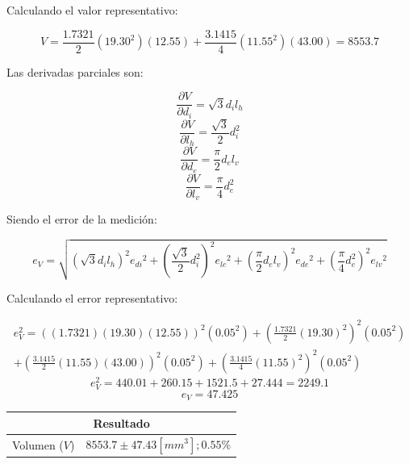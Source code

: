 \documentclass[letter,11pt]{article}
\begin{document}
Calculando el valor representativo:

\begin{equation*}
    V = \frac{1.7321}{2}(19.30^2)(12.55)+\frac{3.1415}{4}(11.55^2)(43.00)=8553.7
\end{equation*}

Las derivadas parciales son:

\begin{equation}
    \frac{\partial{V}}{\partial{d_i}} = \sqrt{3} d_i l_h
\end{equation}
\begin{equation}
    \frac{\partial{V}}{\partial{l_h}} = \frac{\sqrt{3}}{2} d_i^2
\end{equation}
\begin{equation}
    \frac{\partial{V}}{\partial{d_e}} = \frac{\pi}{2} d_e l_v
\end{equation}
\begin{equation}
    \frac{\partial{V}}{\partial{l_v}} = \frac{\pi}{4} d_e^2
\end{equation}

Siendo el error de la medición:

\begin{equation}
    e_V = \sqrt{
        \left(\sqrt{3}d_il_h\right)^2{e_{di}}^2+
        \left(\frac{\sqrt{3}}{2}d_i^2\right)^2{e_{lc}}^2+
        \left(\frac{\pi}{2}d_el_v\right)^2{e_{de}}^2+
        \left(\frac{\pi}{4}d_e^2\right)^2{e_{lv}}^2
    }
\end{equation}

Calculando el error representativo:

\begin{equation*}
\begin{split}
    e_V^2 = 
        \left((1.7321)(19.30)(12.55)\right)^2(0.05^2)+
        \left(\frac{1.7321}{2}(19.30)^2\right)^2(0.05^2)\\
        +\left(\frac{3.1415}{2}(11.55)(43.00)\right)^2(0.05^2)+
        \left(\frac{3.1415}{4}(11.55)^2\right)^2(0.05^2)
\end{split}
\end{equation*}
\begin{equation*}
    e_V^2 = 440.01 + 260.15 + 1521.5 + 27.444 = 2249.1 
\end{equation*}
\begin{equation*}
    e_V = 47.425
\end{equation*}

\begin{center}
\begin{tabular}{|c|>{\centering}m{5.0cm}<{\centering}|}
\hline
\multicolumn{2}{|c|}{\textbf{Resultado}}
\tabularnewline \hline
Volumen ($V$) & $8553.7 \pm 47.43 [mm^3]; 0.55\%$ \tabularnewline \hline
\end{tabular}
\end{center}
\end{document}
